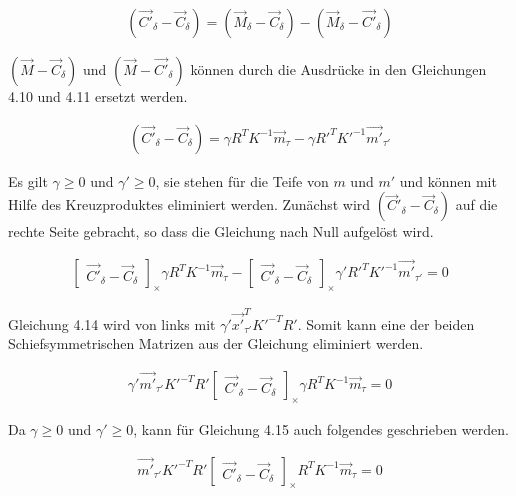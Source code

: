  \begin{gather}
 	(\vec{C'}_\delta - \vec{C}_\delta) = (\vec{M}_\delta - \vec{C}_\delta) - (\vec{M}_\delta - \vec{C'}_\delta)
 \end{gather}
 
 $(\vec{M}-\vec{C}_\delta)$ und $(\vec{M} - \vec{C'}_\delta)$ können durch die Ausdrücke in den Gleichungen 4.10 und 4.11 ersetzt werden.
 
 \begin{gather}
 	(\vec{C'}_\delta - \vec{C}_\delta) = \gamma R^TK^{-1}\vec{m}_\tau - \gamma R'^TK'^{-1}\vec{m'}_{\tau'}
 \end{gather}
 
 Es gilt $\gamma \geq 0$ und $\gamma' \geq 0$, sie stehen für die Teife von $m$ und $m'$ und können mit Hilfe des Kreuzproduktes eliminiert werden\cite{Elements}. Zunächst wird $(\vec{C}'_\delta - \vec{C}_\delta)$ auf die rechte Seite gebracht, so dass die Gleichung nach Null aufgelöst wird.
 
 
 \begin{gather}
 	\begin{bmatrix}\vec{C'}_\delta - \vec{C}_\delta\end{bmatrix}_\times \gamma R^TK^{-1}\vec{m}_\tau - 
 	\begin{bmatrix}	\vec{C'}_\delta - \vec{C}_\delta\end{bmatrix}_\times \gamma' R'^TK'^{-1} \vec{m'}_{\tau'} =  0
 \end{gather}
 
 Gleichung 4.14 wird von links mit $\gamma' \vec{x'}^T_{\tau'}K'^{-T}R'$. Somit kann eine der beiden Schiefsymmetrischen Matrizen aus der Gleichung eliminiert werden. 
 
 \begin{gather}
 	\gamma' \vec{m'}_{\tau'} K'^{-T}R' \begin{bmatrix}	\vec{C'}_\delta - \vec{C}_\delta\end{bmatrix}_\times \gamma R^TK^{-1}\vec{m}_\tau = 0
 \end{gather}
 
 Da $\gamma \geq 0$ und $\gamma' \geq 0$, kann für Gleichung 4.15 auch folgendes geschrieben werden.
 
 \begin{gather}
 	\vec{m'}_{\tau'} K'^{-T}R' \begin{bmatrix}	\vec{C'}_\delta - \vec{C}_\delta\end{bmatrix}_\times R^TK^{-1}\vec{m}_\tau = 0
 \end{gather}
 
